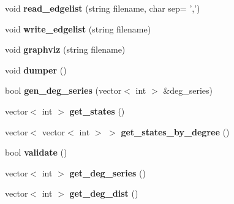 \begin{DoxyCompactItemize}
\item 
\hypertarget{classelps_1_1_lab_network_acbc1686894dfb5534520732c15c83fe6}{void {\bfseries read\-\_\-edgelist} (string filename, char sep= ',')}\label{classelps_1_1_lab_network_acbc1686894dfb5534520732c15c83fe6}

\item 
\hypertarget{classelps_1_1_lab_network_aaeb95b5cdeee0b64fbb59a5f185caf2b}{void {\bfseries write\-\_\-edgelist} (string filename)}\label{classelps_1_1_lab_network_aaeb95b5cdeee0b64fbb59a5f185caf2b}

\item 
\hypertarget{classelps_1_1_lab_network_aa594d7fa73c3cf81dfefb331f8cc50c5}{void {\bfseries graphviz} (string filename)}\label{classelps_1_1_lab_network_aa594d7fa73c3cf81dfefb331f8cc50c5}

\item 
\hypertarget{classelps_1_1_lab_network_a6468ba129125eca0b5e6286ddf798f8c}{void {\bfseries dumper} ()}\label{classelps_1_1_lab_network_a6468ba129125eca0b5e6286ddf798f8c}

\item 
\hypertarget{classelps_1_1_lab_network_ae8ecc74c372d8a13c01d22bd4936b5bc}{bool {\bfseries gen\-\_\-deg\-\_\-series} (vector$<$ int $>$ \&deg\-\_\-series)}\label{classelps_1_1_lab_network_ae8ecc74c372d8a13c01d22bd4936b5bc}

\item 
\hypertarget{classelps_1_1_lab_network_a612ff25d66d51bd0c32efe965049a908}{vector$<$ int $>$ {\bfseries get\-\_\-states} ()}\label{classelps_1_1_lab_network_a612ff25d66d51bd0c32efe965049a908}

\item 
\hypertarget{classelps_1_1_lab_network_a290cb80cbb0d496252eae9d828851a16}{vector$<$ vector$<$ int $>$ $>$ {\bfseries get\-\_\-states\-\_\-by\-\_\-degree} ()}\label{classelps_1_1_lab_network_a290cb80cbb0d496252eae9d828851a16}

\item 
\hypertarget{classelps_1_1_lab_network_aaa17daca60c737db1f1035f058ecce38}{bool {\bfseries validate} ()}\label{classelps_1_1_lab_network_aaa17daca60c737db1f1035f058ecce38}

\item 
\hypertarget{classelps_1_1_lab_network_a902bedf2660f1abe82f52eb945f61417}{vector$<$ int $>$ {\bfseries get\-\_\-deg\-\_\-series} ()}\label{classelps_1_1_lab_network_a902bedf2660f1abe82f52eb945f61417}

\item 
\hypertarget{classelps_1_1_lab_network_a040ead6f3849f210eda46f67a299b12b}{vector$<$ int $>$ {\bfseries get\-\_\-deg\-\_\-dist} ()}\label{classelps_1_1_lab_network_a040ead6f3849f210eda46f67a299b12b}


\end{DoxyCompactItemize}
